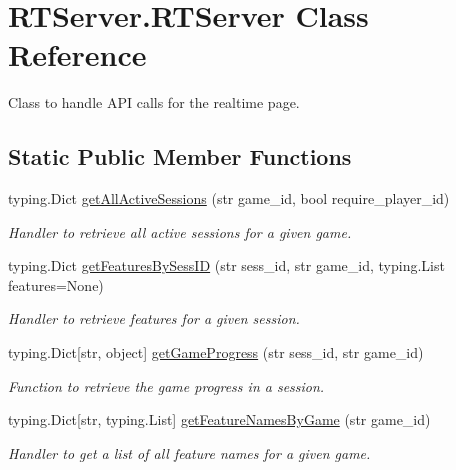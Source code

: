 \hypertarget{class_r_t_server_1_1_r_t_server}{}\section{R\+T\+Server.\+R\+T\+Server Class Reference}
\label{class_r_t_server_1_1_r_t_server}


Class to handle A\+PI calls for the realtime page.  


\subsection*{Static Public Member Functions}
\begin{DoxyCompactItemize}
\item 
typing.\+Dict \mbox{\hyperlink{class_r_t_server_1_1_r_t_server_a36d42dbd33f9a79872c66c332a6d5591}{get\+All\+Active\+Sessions}} (str game\+\_\+id, bool require\+\_\+player\+\_\+id)
\begin{DoxyCompactList}\small\item\em Handler to retrieve all active sessions for a given game. \end{DoxyCompactList}\item 
typing.\+Dict \mbox{\hyperlink{class_r_t_server_1_1_r_t_server_a293c91396d24ffed4891b61337856373}{get\+Features\+By\+Sess\+ID}} (str sess\+\_\+id, str game\+\_\+id, typing.\+List features=None)
\begin{DoxyCompactList}\small\item\em Handler to retrieve features for a given session. \end{DoxyCompactList}\item 
typing.\+Dict\mbox{[}str, object\mbox{]} \mbox{\hyperlink{class_r_t_server_1_1_r_t_server_a005a0fe014193b09a5e708714f64b5e4}{get\+Game\+Progress}} (str sess\+\_\+id, str game\+\_\+id)
\begin{DoxyCompactList}\small\item\em Function to retrieve the game progress in a session. \end{DoxyCompactList}\item 
typing.\+Dict\mbox{[}str, typing.\+List\mbox{]} \mbox{\hyperlink{class_r_t_server_1_1_r_t_server_aa1154804acf028df8741b5ff5282458c}{get\+Feature\+Names\+By\+Game}} (str game\+\_\+id)
\begin{DoxyCompactList}\small\item\em Handler to get a list of all feature names for a given game. \end{DoxyCompactList}\item 

\end{DoxyCompactItemize}
